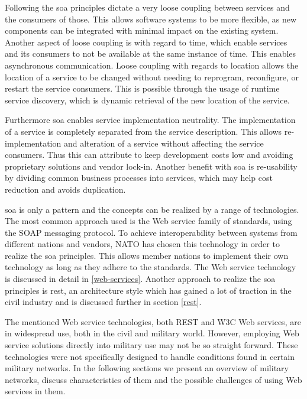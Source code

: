 Following the \gls{soa} principles dictate a very loose coupling between
services and the consumers of those. This allows software systems to be more
flexible, as new components can be integrated with minimal impact on the
existing system. Another aspect of loose coupling is with regard to time, which
enable services and its consumers to not be available at the same instance of
time. This enables asynchronous communication. Loose coupling with regards to
location allows the location of a service to be changed without needing to
reprogram, reconfigure, or restart the service consumers. This is possible
through the usage of runtime service discovery, which is dynamic retrieval of
the new location of the service.

Furthermore \gls{soa} enables service implementation neutrality. The
implementation of a service is completely separated from the service
description. This allows re-implementation and alteration of a service without
affecting the service consumers. Thus this can attribute to keep development
costs low and avoiding proprietary solutions and vendor lock-in. Another
benefit with \gls{soa} is re-usability by dividing common business processes
into services, which may help cost reduction and avoids duplication.

\gls{soa} is only a pattern and the concepts can be realized by a range of
technologies. The most common approach used is the Web service family of
standards, using the SOAP messaging protocol. To achieve interoperability
between systems from different nations and vendors, NATO has chosen this
technology in order to realize the \gls{soa} principles\cite{soa-baseline}. This
allows member nations to implement their own technology as long as they adhere
to the standards. The Web service technology is discussed in detail in
\cref{web-services}. Another approach to realize the \gls{soa} principles is
\gls{rest}, an architecture style which has gained a lot of traction in the
civil industry and is discussed further in section \cref{rest}.

The mentioned Web service technologies, both REST and W3C Web services, are in
widespread use, both in the civil and military world. However, employing Web
service solutions directly into military use may not be so straight forward.
These technologies were not specifically designed to handle conditions found in
certain military networks. In the following sections we present an overview of
military networks, discuss characteristics of them and the possible challenges
of using Web services in them.

